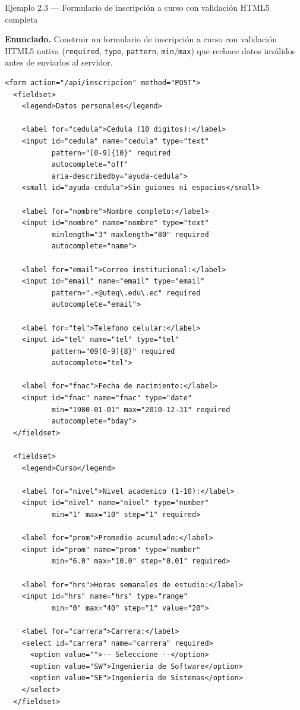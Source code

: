 \documentclass[11pt,a4paper,openany]{book}
\begin{document}
\begin{cajaejemplo}{Ejemplo 2.3 --- Formulario de inscripción a curso con validación HTML5 completa}

\textbf{Enunciado.} Construir un formulario de inscripción a curso con validación HTML5 nativa (\texttt{required}, \texttt{type}, \texttt{pattern}, \texttt{min}/\texttt{max}) que rechace datos inválidos antes de enviarlos al servidor.

\begin{lstlisting}[style=html,caption={inscripcion.html (formulario funcional)},label=lst:2.6]
<form action="/api/inscripcion" method="POST">
  <fieldset>
    <legend>Datos personales</legend>

    <label for="cedula">Cedula (10 digitos):</label>
    <input id="cedula" name="cedula" type="text"
           pattern="[0-9]{10}" required
           autocomplete="off"
           aria-describedby="ayuda-cedula">
    <small id="ayuda-cedula">Sin guiones ni espacios</small>

    <label for="nombre">Nombre completo:</label>
    <input id="nombre" name="nombre" type="text"
           minlength="3" maxlength="80" required
           autocomplete="name">

    <label for="email">Correo institucional:</label>
    <input id="email" name="email" type="email"
           pattern=".+@uteq\.edu\.ec" required
           autocomplete="email">

    <label for="tel">Telefono celular:</label>
    <input id="tel" name="tel" type="tel"
           pattern="09[0-9]{8}" required
           autocomplete="tel">

    <label for="fnac">Fecha de nacimiento:</label>
    <input id="fnac" name="fnac" type="date"
           min="1980-01-01" max="2010-12-31" required
           autocomplete="bday">
  </fieldset>

  <fieldset>
    <legend>Curso</legend>

    <label for="nivel">Nivel academico (1-10):</label>
    <input id="nivel" name="nivel" type="number"
           min="1" max="10" step="1" required>

    <label for="prom">Promedio acumulado:</label>
    <input id="prom" name="prom" type="number"
           min="6.0" max="10.0" step="0.01" required>

    <label for="hrs">Horas semanales de estudio:</label>
    <input id="hrs" name="hrs" type="range"
           min="0" max="40" step="1" value="20">

    <label for="carrera">Carrera:</label>
    <select id="carrera" name="carrera" required>
      <option value="">-- Seleccione --</option>
      <option value="SW">Ingenieria de Software</option>
      <option value="SE">Ingenieria de Sistemas</option>
    </select>
  </fieldset>


\end{lstlisting}
\end{cajaejemplo}
\end{document}
